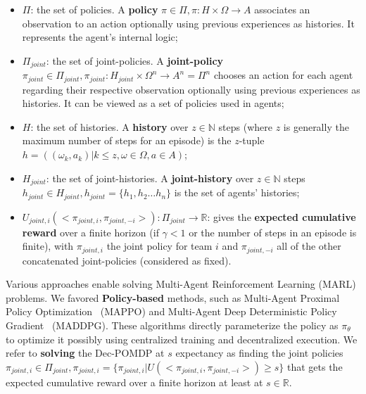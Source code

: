 \documentclass[runningheads]{llncs}
\theoremstyle{freethm}
\theoremstyle{proofoutline}
\begin{document}
\begin{itemize}

    \item $\Pi$: the set of policies. A \textbf{policy} $\pi \in \Pi, \pi: H \times \Omega \rightarrow A$ associates an observation to an action optionally using previous experiences as histories. It represents the agent's internal logic;
    \item $\Pi_{joint}$: the set of joint-policies. A \textbf{joint-policy} $\pi_{joint} \in \Pi_{joint}, \pi_{joint}: H_{joint} \times \Omega^n \rightarrow A^n = \Pi^n$ chooses an action for each agent regarding their respective observation optionally using previous experiences as histories. It can be viewed as a set of policies used in agents;
    \item $H$: the set of histories. A \textbf{history} over $z \in \mathbb{N}$ steps (where $z$ is generally the maximum number of steps for an episode) is the $z$-tuple $h = ((\omega_{k}, a_{k}) | k \leq z, \omega \in \Omega, a \in A)$;
    \item $H_{joint}$: the set of joint-histories. A \textbf{joint-history} over $z \in \mathbb{N}$ steps $h_{joint} \in H_{joint}, h_{joint} = \{h_1,h_2 \dots h_n\}$ is the set of agents' histories;
    \item $U_{joint,i}(<\pi_{joint,i}, \pi_{joint,-i}>): \Pi_{joint} \rightarrow \mathbb{R}$: gives the \textbf{expected cumulative reward} over a finite horizon (if $\gamma < 1$ or the number of steps in an episode is finite), with $\pi_{joint,i}$ the joint policy for team $i$ and $\pi_{joint,-i}$ all of the other concatenated joint-policies (considered as fixed).
\end{itemize}

Various approaches enable solving Multi-Agent Reinforcement Learning (MARL) problems. We favored \textbf{Policy-based} methods, such as Multi-Agent Proximal Policy Optimization~\cite{yu2022surprising} (MAPPO) and Multi-Agent Deep Deterministic Policy Gradient~\cite{Lowe2017} (MADDPG). These algorithms directly parameterize the policy as $\pi_\theta$ to optimize it possibly using centralized training and decentralized execution.
We refer to \textbf{solving} the Dec-POMDP at $s$ expectancy as finding the joint policies $\pi_{joint,i} \in \Pi_{joint}, \pi_{joint,i} = \{\pi_{joint,i} | U(<\pi_{joint,i},\pi_{joint,-i}>) \geq s\}$ that gets the expected cumulative reward over a finite horizon at least at $s \in \mathbb{R}$.
\end{document}
